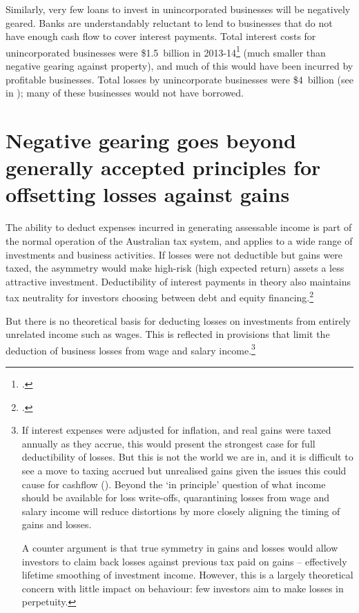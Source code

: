 Similarly, very few loans to invest in unincorporated businesses will be negatively geared. Banks are understandably reluctant to lend to businesses that do not have enough cash flow to cover interest payments. Total interest costs for unincorporated businesses were \$1.5~billion in 2013-14\footcite{ATOTaxstats201314} (much smaller than negative gearing against property), and much of this would have been incurred by profitable businesses. Total losses by unincorporate businesses were \$4~billion (see  in ); many of these businesses would not have borrowed. 

\section{Negative gearing goes beyond generally accepted principles for offsetting losses against gains}\label{sec:NG-goes-beyond-accepted-principles-for-offsetting-losses}
The ability to deduct expenses incurred in generating assessable income is part of the normal operation of the Australian tax system, and applies to a wide range of investments and business activities. If losses were not deductible but gains were taxed, the asymmetry would make high-risk (high expected return) assets a less attractive investment. Deductibility of interest payments in theory also maintains tax neutrality for investors choosing between debt and equity financing.\footcite{FaneRichardson2004}   

But there is no theoretical basis for deducting losses on investments from entirely unrelated income such as wages. This is reflected in provisions that limit the deduction of business losses from wage and salary income.\footnote{If interest expenses were adjusted for inflation, and real gains were taxed annually as they accrue, this would present the strongest case for full deductibility of losses. But this is not the world we are in, and it is difficult to see a move to taxing accrued but unrealised gains given the issues this could cause for cashflow (). Beyond the ‘in principle’ question of what income should be available for loss write-offs, quarantining losses from wage and salary income will reduce distortions by more closely aligning the timing of gains and losses.

A counter argument is that true symmetry in gains and losses would allow investors to claim back losses against previous tax paid on gains -- effectively lifetime smoothing of investment income. However, this is a largely theoretical concern with little impact on behaviour: few investors aim to make losses in perpetuity.} 

